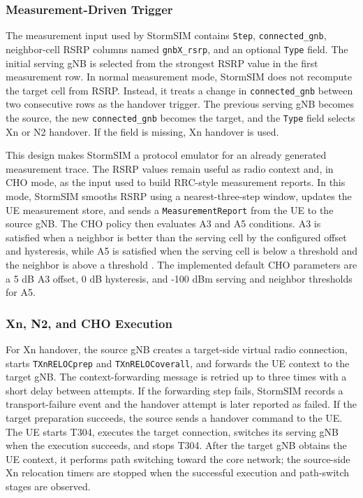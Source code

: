 \subsubsection{Measurement-Driven Trigger}

The measurement input used by StormSIM contains \texttt{Step},
\texttt{connected\_gnb}, neighbor-cell RSRP columns named
\texttt{gnbX\_rsrp}, and an optional \texttt{Type} field. The initial serving
gNB is selected from the strongest RSRP value in the first measurement row. In
normal measurement mode, StormSIM does not recompute the target cell from RSRP.
Instead, it treats a change in \texttt{connected\_gnb} between two consecutive
rows as the handover trigger. The previous serving gNB becomes the source, the
new \texttt{connected\_gnb} becomes the target, and the \texttt{Type} field
selects Xn or N2 handover. If the field is missing, Xn handover is used.

This design makes StormSIM a protocol emulator for an already generated
measurement trace. The RSRP values remain useful as radio context and, in CHO
mode, as the input used to build RRC-style measurement reports. In this mode,
StormSIM smooths RSRP using a nearest-three-step window, updates the UE
measurement store, and sends a \texttt{MeasurementReport} from the UE to the
source gNB. The CHO policy then evaluates A3 and A5 conditions. A3 is satisfied
when a neighbor is better than the serving cell by the configured offset and
hysteresis, while A5 is satisfied when the serving cell is below a threshold and
the neighbor is above a threshold \cite{3gpp_38331}. The implemented default
CHO parameters are a 5 dB A3 offset, 0 dB hysteresis, and -100 dBm serving and
neighbor thresholds for A5.

\subsubsection{Xn, N2, and CHO Execution}

For Xn handover, the source gNB creates a target-side virtual radio connection,
starts \texttt{TXnRELOCprep} and \texttt{TXnRELOCoverall}, and forwards the UE
context to the target gNB. The context-forwarding message is retried up to
three times with a short delay between attempts. If the forwarding step fails,
StormSIM records a transport-failure event and the handover attempt is later
reported as failed. If the target preparation succeeds, the source sends a
handover command to the UE. The UE starts T304, executes the target connection,
switches its serving gNB when the execution succeeds, and stops T304. After the
target gNB obtains the UE context, it performs path switching toward the core
network; the source-side Xn relocation timers are stopped when the successful
execution and path-switch stages are observed.

